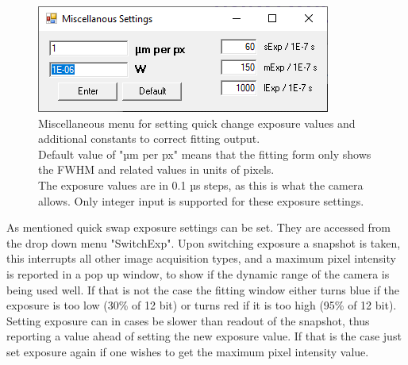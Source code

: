 \documentclass[twoside,openright]{scrreprt}
\begin{document}
\begin{figure}[hbtp]
\centering
\includegraphics[scale=1]{images/ArtrayExamplePics/DefaultMiscSettings.PNG}
\caption{Miscellaneous menu for setting quick change exposure values and additional constants to correct fitting output.\\
Default value of "µm per px" means that the fitting form only shows the FWHM and related values in units of pixels.\\
The exposure values are in 0.1 µs steps, as this is what the camera allows. Only integer input is supported for these exposure settings.\label{LiveFitting:MiscMenu}}
\end{figure}



As mentioned quick swap exposure settings can be set. They are accessed from the drop down menu "SwitchExp". Upon switching exposure a snapshot is taken, this interrupts all other image acquisition types, and a maximum pixel intensity is reported in a pop up window, to show if the dynamic range of the camera is being used well. If that is not the case the fitting window either turns blue if the exposure is too low (30\% of 12 bit) or turns red if it is too high (95\% of 12 bit). Setting exposure can in cases be slower than readout of the snapshot, thus reporting a value ahead of setting the new exposure value. If that is the case just set exposure again if one wishes to get the maximum pixel intensity value.\\
\end{document}

